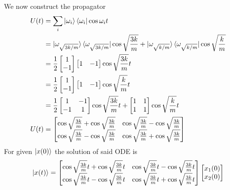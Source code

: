 \documentclass[../../../main.tex]{subfiles}
\begin{document}
We now construct the propagator
\begin{align*}
	U(t) & =\sum_i \ket{\omega_i} \bra{\omega_i} \cos \omega_i t                                                                                                    \\
	     & =\ket{\omega_{\sqrt{3k/m}}}\bra{\omega_{\sqrt{3k/m}}}\cos \sqrt{\frac{3k}{m}}+\ket{\omega_{\sqrt{k/m}}}\bra{\omega_{\sqrt{k/m}}}\cos \sqrt{\frac{k }{m}} \\
	     & =\frac{1}{2}
	\begin{bmatrix}
		1 \\-1
	\end{bmatrix}
	\begin{bmatrix}
		1 & -1
	\end{bmatrix}
	\cos \sqrt{\frac{3k }{m }}t\\
    &=	\frac{1}{2}
	\begin{bmatrix}
		1 \\-1
	\end{bmatrix}
	\begin{bmatrix}
		1 & -1
	\end{bmatrix}
	\cos \sqrt{\frac{k }{m }}t\\
	     & =\frac{1}{2}
	\begin{bmatrix}
		1  & -1 \\
		-1 & 1  \\
	\end{bmatrix}
	\cos \sqrt{\frac{3k }{m }}t
	+
	\begin{bmatrix}
		1 & 1 \\
		1 & 1 \\
	\end{bmatrix}
	\cos \sqrt{\frac{k }{m }}t\\
	U(t) & =
	\begin{bmatrix}
		\cos \sqrt{\frac{3k }{m }}+\cos \sqrt{\frac{3k }{m }} & \cos \sqrt{\frac{3k }{m }}-\cos \sqrt{\frac{3k }{m }}\\
		\cos \sqrt{\frac{3k }{m }}-\cos \sqrt{\frac{3k }{m }} & \cos \sqrt{\frac{3k }{m }}+\cos \sqrt{\frac{3k }{m }}
	\end{bmatrix}
\end{align*}
For given $\ket{x(0)}$ the solution of said ODE is 
\begin{equation*}
    \ket{x(t)}=
    \begin{bmatrix}
		\cos \sqrt{\frac{3k }{m }}t+\cos \sqrt{\frac{3k }{m }}t & \cos \sqrt{\frac{3k }{m }}t-\cos \sqrt{\frac{3k }{m }}t\\
		\cos \sqrt{\frac{3k }{m }}t-\cos \sqrt{\frac{3k }{m }} t& \cos \sqrt{\frac{3k }{m }}t+\cos \sqrt{\frac{3k }{m }}t
	\end{bmatrix}
    \begin{bmatrix}
        x_1(0)\\
        x_2(0)\\
    \end{bmatrix}
\end{equation*}
\end{document}
